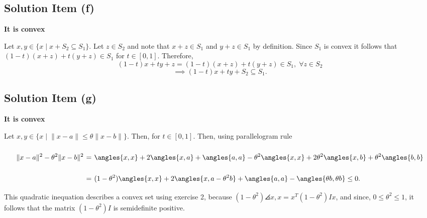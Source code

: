 \subsection*{Solution Item (f)}

\textbf{It is convex}

Let $x,y \in \{x \;|\; x+S_2 \subseteq S_1\}$. Let $z \in S_2$ and note that $x+z \in S_1$ and $y+z \in S_1$ by definition. Since $S_1$ is convex it follows that $(1-t)(x+z) + t(y+z) \in S_1$ for $t \in [0,1]$. Therefore,
\[ (1-t)x+ty + z = (1-t)(x+z) + t(y+z) \in S_1,\; \forall z \in S_2 \]
\[  \implies (1-t)x+ty + S_2 \subseteq S_1. \]

\subsection*{Solution Item (g)}

\textbf{It is convex}

Let $x,y \in \{x \;|\; \|x - a\| \leq \theta\|x - b\| \}$. Then, for $t \in [0,1]$. Then, using parallelogram rule
\[ \everymath{\displaystyle}
\arraycolsep=1.8pt\def\arraystretch{2.5}
\begin{array}{rcl}
    \|x-a\|^2 - \theta^2 \|x-b\|^2 & = & \angles{x,x}+2\angles{x,a}+\angles{a,a} - \theta^2 \angles{x,x}+2\theta^2\angles{x,b}+\theta^2\angles{b,b}\\
    & = & (1-\theta^2 )\angles{x,x} + 2 \angles{x,a-\theta^2 b} + \angles{a,a}-\angles{\theta b,\theta b} \leq 0.
\end{array} \]
This quadratic inequation describes a convex set using exercise 2, because $(1-\theta^2) \angles{x,x} = x^T (1-\theta^2) I x$, and since, $0\leq \theta^2 \leq 1$, it follows that the matrix $ (1-\theta^2) I$ is semidefinite positive.